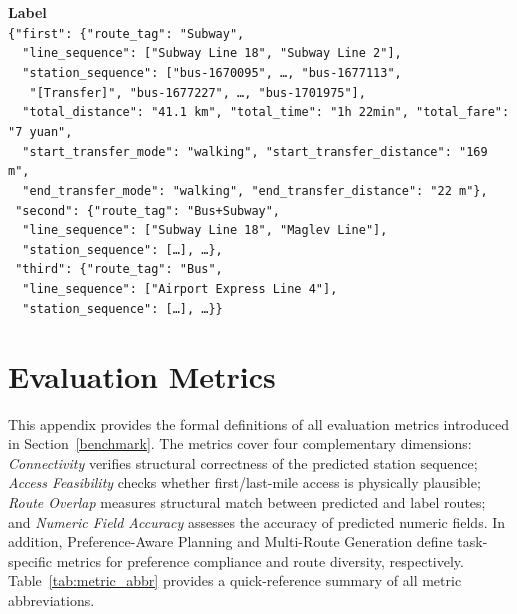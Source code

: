 \documentclass{article}
\begin{document}
\begin{tcolorbox}[colback=gray!3, colframe=black!40, boxrule=0.4pt, arc=2pt, left=6pt, right=6pt, top=4pt, bottom=4pt, fontupper=\small, fontlower=\small, breakable, title={\small\textbf{Prompt \& Label}}]
\vspace{6pt}
\textbf{Label} \\[4pt]
\texttt{\{"first": \{"route\_tag": "Subway",} \\
\texttt{~~"line\_sequence": ["Subway Line 18", "Subway Line 2"],} \\
\texttt{~~"station\_sequence": ["bus-1670095", \ldots, "bus-1677113",} \\
\texttt{~~~"[Transfer]", "bus-1677227", \ldots, "bus-1701975"],} \\
\texttt{~~"total\_distance": "41.1 km", "total\_time": "1h 22min", "total\_fare": "7 yuan",} \\
\texttt{~~"start\_transfer\_mode": "walking", "start\_transfer\_distance": "169 m",} \\
\texttt{~~"end\_transfer\_mode": "walking", "end\_transfer\_distance": "22 m"\},} \\[3pt]
\texttt{~"second": \{"route\_tag": "Bus+Subway",} \\
\texttt{~~"line\_sequence": ["Subway Line 18", "Maglev Line"],} \\
\texttt{~~"station\_sequence": [\ldots], \ldots\},} \\[3pt]
\texttt{~"third": \{"route\_tag": "Bus",} \\
\texttt{~~"line\_sequence": ["Airport Express Line 4"],} \\
\texttt{~~"station\_sequence": [\ldots], \ldots\}\}}
\end{tcolorbox}

\section{Evaluation Metrics}
\label{app:metrics}

This appendix provides the formal definitions of all evaluation metrics introduced in Section~\ref{benchmark}. The metrics cover four complementary dimensions: \textit{Connectivity} verifies structural correctness of the predicted station sequence; \textit{Access Feasibility} checks whether first/last-mile access is physically plausible; \textit{Route Overlap} measures structural match between predicted and label routes; and \textit{Numeric Field Accuracy} assesses the accuracy of predicted numeric fields. In addition, Preference-Aware Planning and Multi-Route Generation define task-specific metrics for preference compliance and route diversity, respectively. Table~\ref{tab:metric_abbr} provides a quick-reference summary of all metric abbreviations.
\end{document}

